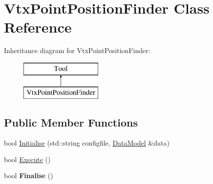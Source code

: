 \hypertarget{classVtxPointPositionFinder}{\section{Vtx\-Point\-Position\-Finder Class Reference}
\label{classVtxPointPositionFinder}
}
Inheritance diagram for Vtx\-Point\-Position\-Finder\-:\begin{figure}[H]
\begin{center}
\leavevmode
\includegraphics[height=2.000000cm]{classVtxPointPositionFinder}
\end{center}
\end{figure}
\subsection*{Public Member Functions}
\begin{DoxyCompactItemize}
\item 
bool \hyperlink{classVtxPointPositionFinder_ab0115f74f010c3e26e090deb52723588}{Initialise} (std\-::string configfile, \hyperlink{classDataModel}{Data\-Model} \&data)
\item 
bool \hyperlink{classVtxPointPositionFinder_abc134ec88b75db5673009ac0a94509f7}{Execute} ()
\item 
\hypertarget{classVtxPointPositionFinder_ac3430701c487e4cd16f208b20439cec2}{bool {\bfseries Finalise} ()}\label{classVtxPointPositionFinder_ac3430701c487e4cd16f208b20439cec2}

\end{DoxyCompactItemize}


